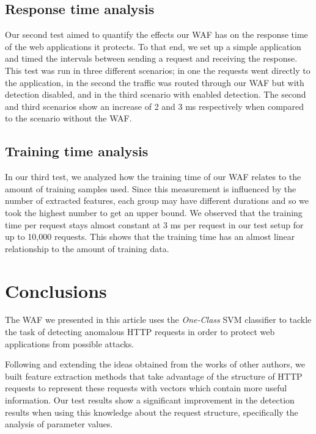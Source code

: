 \subsection{Response time analysis}

Our second test aimed to quantify the effects our WAF has on the response
time of the web applications it protects. To that end, we set up a simple
application and timed the intervals between sending a request and receiving
the response. This test was run in three different scenarios; in one the
requests went directly to the application, in the second the traffic was
routed through our WAF but with detection disabled, and in the third
scenario with enabled detection.
The second and third scenarios show an increase of 2 and 3 ms respectively
when compared to the scenario without the WAF.


\subsection{Training time analysis}

In our third test, we analyzed how the training time of our WAF relates to
the amount of training samples used. Since this measurement is influenced
by the number of extracted features, each group may have different durations
and so we took the highest number to get an upper bound.
We observed that the training time per request stays almost constant at
3 ms per request in our test setup for up to 10,000 requests.
This shows that the training time has an almost linear relationship to the
amount of training data.


\section{Conclusions}
\label{chap:conclusions}

The WAF we presented in this article uses the \textit{One-Class} SVM
classifier to tackle the task of detecting anomalous HTTP requests in
order to protect web applications from possible attacks.

Following and extending the ideas obtained from the works of other authors,
we built feature extraction methods that take advantage of the structure of
HTTP requests to represent these requests with vectors which contain more
useful information.
Our test results show a significant improvement in the detection results
when using this knowledge about the request structure, specifically the
analysis of parameter values.

